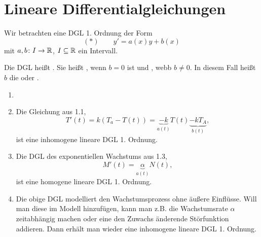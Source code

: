 \chapter{Lineare Differentialgleichungen}
Wir betrachten eine DGL 1. Ordnung der Form
\[ (\ast)\qquad y'=a(x)y+b(x) \]
mit $ a,b\colon I\rightarrow\mathbb{R} $, $ I\subseteq\mathbb{R} $ ein Intervall.
\begin{definition}
	Die DGL hei\ss t . Sie hei\ss t , wenn $ b=0 $ ist und , webb $ b\neq 0 $. In diesem Fall hei\ss t $ b $ die  oder .
\end{definition}
\begin{beispiel}
	\begin{enumerate}
		\item[]
		\item Die Gleichung aus 1.1, \[ T'(t)=k(T_a-T(t))=\underbrace{-k}_{a(t)}T(t)\underbrace{-kT_A}_{b(t)}, \]
		ist eine inhomogene lineare DGL 1. Ordnung.
		\item Die DGL des exponentiellen Wachstums aus 1.3,
		\[ M'(t)=\underbrace{\alpha}_{a(t)}N(t), \]
		ist eine homogene lineare DGL 1. Ordnung.
		\item Die obige DGL modelliert den Wachstumsprozess ohne \"au\ss ere Einfl\"usse. Will man diese im Modell hinzuf\"ugen, kann man z.B. die Wachstumsrate $ \alpha $ zeitabh\"angig machen oder eine den Zuwachs \"anderende St\"orfunktion addieren. Dann erh\"alt man wieder eine inhomogene lineare DGL 1. Ordnung.  
	\end{enumerate}
\end{beispiel}
%
%
%
%
%
%
%
%
%
